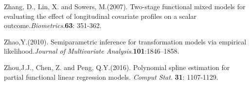 \documentclass[preprint,12pt]{elsarticle}
\begin{document}
\begin{thebibliography}{9}
	Zhang, D., Lin, X. and Sowers, M.(2007). Two-stage functional mixed models for evaluating the effect of longitudinal covariate profiles on a scalar outcome.\textit{Biometrics}.{\bf 63}: 351-362.

	Zhao,Y.(2010). Semiparametric inference for transformation models via	empirical likelihood.\textit{Journal of Multivariate Analysis}.{\bf 101}:1846–1858.

	Zhou,J.J., Chen, Z. and Peng, Q.Y.(2016). Polynomial spline estimation for partial functional linear regression models. \textit{Comput Stat}. {\bf 31}: 1107-1129.
	

	


	
	
	
	\end{thebibliography}
	
	
	
	
	
	
	
\end{document}
